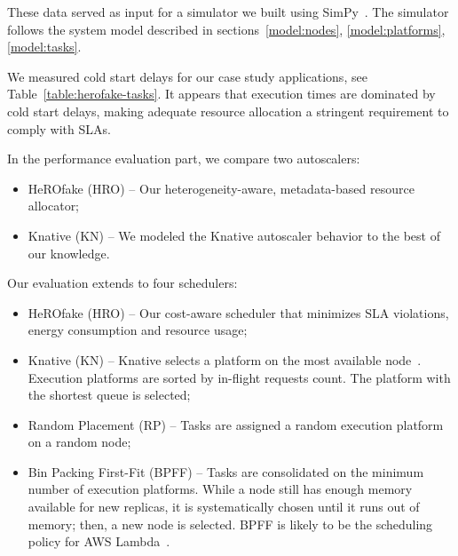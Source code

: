These data served as input for a simulator we built using SimPy~\cite{simpy}. The simulator follows the system model described in sections~\ref{model:nodes}, \ref{model:platforms}, \ref{model:tasks}.

We measured cold start delays for our case study applications, see Table~\ref{table:herofake-tasks}. It appears that execution times are dominated by cold start delays, making adequate resource allocation a stringent requirement to comply with SLAs.

In the performance evaluation part, we compare two autoscalers:
\begin{itemize}
    \item HeROfake (HRO) -- Our heterogeneity-aware, metadata-based resource allocator;
    \item Knative (KN) -- We modeled the Knative autoscaler behavior to the best of our knowledge.
\end{itemize}

Our evaluation extends to four schedulers:

\begin{itemize}
    \item HeROfake (HRO) -- Our cost-aware scheduler that minimizes SLA violations, energy consumption and resource usage;
    \item Knative (KN) -- Knative selects a platform on the most available node~\cite{sureshENSUREEfficientScheduling2020}. Execution platforms are sorted by in-flight requests count. The platform with the shortest queue is selected;
    \item Random Placement (RP) -- Tasks are assigned a random execution platform on a random node;
    \item Bin Packing First-Fit (BPFF) -- Tasks are consolidated on the minimum number of execution platforms. While a node still has enough memory available for new replicas, it is systematically chosen until it runs out of memory; then, a new node is selected. BPFF is likely to be the scheduling policy for AWS Lambda~\cite{wangPeekingCurtainsServerlessb}.
\end{itemize}


